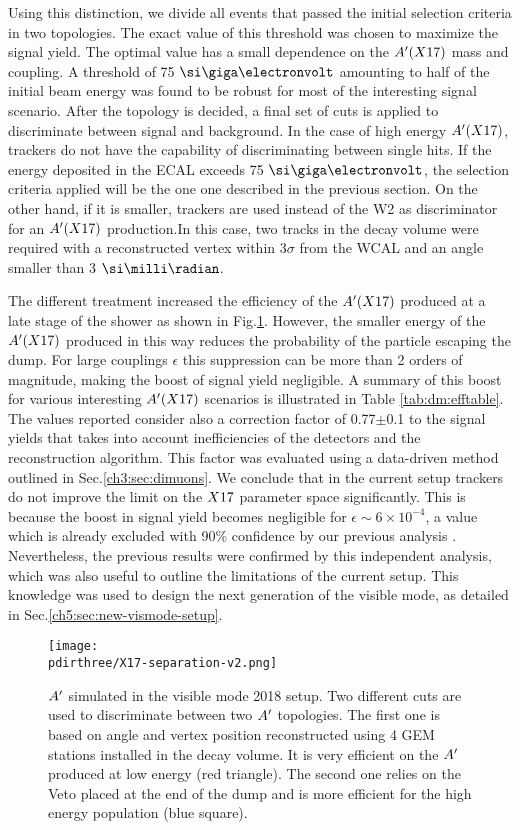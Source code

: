 Using this distinction, we divide all events that passed the initial selection criteria in two topologies.
The exact value of this threshold was chosen to maximize the signal yield. The optimal value has a small dependence on the $A'(X17)$ mass and coupling. A threshold of 75 $\gev$ amounting to half of the initial beam energy was found to be robust for most of the interesting signal scenario. After the topology is decided, a final set of cuts is applied to discriminate between signal and background. In the case of high energy $A'(X17)$, trackers do not have the capability of discriminating between single hits. If the energy deposited in the ECAL exceeds 75 $\gev$, the selection criteria applied will be the one one described in the previous section. On the other hand, if it is smaller, trackers are used instead of the W2 as discriminator for an $A'(X17)$ production.In this case, two tracks in the decay volume were required with a reconstructed vertex within 3$\sigma$ from the WCAL and an angle smaller than 3 $\mrad$.

The different treatment increased the efficiency of the $A'(X17)$ produced at a late stage of the shower as shown in Fig.\ref{fig:combined-analysis}. However, the smaller energy of the $A'(X17)$ produced in this way reduces the probability of the particle escaping the dump. For large couplings $\epsilon$ this suppression can be more than 2 orders of magnitude, making the boost of signal yield negligible. A summary of this boost for various interesting $A'(X17)$ scenarios is illustrated in Table \ref{tab:dm:efftable}. The values reported consider also a correction factor of 0.77$\pm$0.1 to the signal yields that takes into account inefficiencies of the detectors and the reconstruction algorithm. This factor was evaluated using a data-driven method outlined in Sec.\ref{ch3:sec:dimuons}. We conclude that in the current setup trackers do not improve the limit on the $X17$ parameter space significantly. This is because the boost in signal yield becomes negligible for $\epsilon \sim 6 \times 10^{-4}$, a value which is already excluded with 90\% confidence by our previous analysis \cite{Banerjee:2019hmi}. Nevertheless, the previous results were confirmed by this independent analysis, which was also useful to outline the limitations of the current setup. This knowledge was used to design the next generation of the visible mode, as detailed in Sec.\ref{ch5:sec:new-vismode-setup}.

\begin{figure}[tbh!]
  \centering
  \texttt{[image: \\pdirthree/X17-separation-v2.png]}
  \caption[Comparison of selected $\DM$ events between the calorimeter and tracking analysis]{$\DM$ simulated in the visible mode 2018 setup. Two different cuts are used to discriminate between two $\DM$ topologies. The first one is based on angle and vertex position reconstructed using 4 GEM stations installed in the decay volume. It is very efficient on the $\DM$ produced at low energy (red triangle). The second one relies on the Veto placed at the end of the dump and is more efficient for the high energy population (blue square).}
  \label{fig:combined-analysis}
\end{figure}

